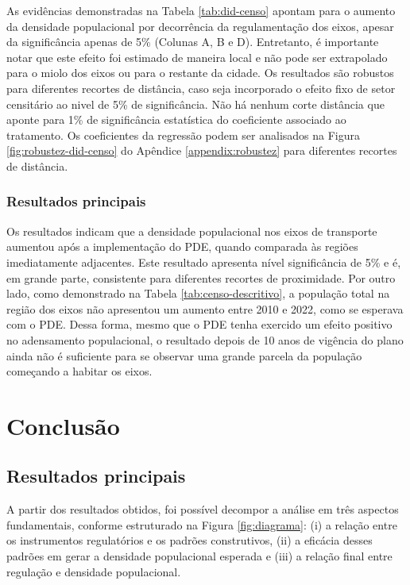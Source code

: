 

As evidências demonstradas na Tabela \ref{tab:did-censo} apontam para o aumento da densidade populacional por decorrência da regulamentação dos eixos, apesar da significância apenas de 5\% (Colunas A, B e D). Entretanto, é importante notar que este efeito foi estimado de maneira local e não pode ser extrapolado para o miolo dos eixos ou para o restante da cidade. Os resultados são robustos para diferentes recortes de distância, caso seja incorporado o efeito fixo de setor censitário ao nivel de 5\% de significância. Não há nenhum corte distância que aponte para 1\% de significância estatística do coeficiente associado ao tratamento. Os coeficientes da regressão podem ser analisados na Figura \ref{fig:robustez-did-censo} do Apêndice \ref{appendix:robustez} para diferentes recortes de distância.

\subsection{Resultados principais}


Os resultados indicam que a densidade populacional nos eixos de transporte aumentou após a implementação do PDE, quando comparada às regiões imediatamente adjacentes. Este resultado apresenta nível significância de 5\% e é, em grande parte, consistente para diferentes recortes de proximidade. Por outro lado, como demonstrado na Tabela \ref{tab:censo-descritivo}, a população total na região dos eixos não apresentou um aumento entre 2010 e 2022, como se esperava com o PDE. Dessa forma, mesmo que o PDE tenha exercido um efeito positivo no adensamento populacional, o resultado depois de 10 anos de vigência do plano ainda não é suficiente para se observar uma grande parcela da população começando a habitar os eixos.


\chapter{Conclusão}
\label{chp:conclusao}

\section{Resultados principais}
\label{sec:conclusao}

A partir dos resultados obtidos, foi possível decompor a análise em três aspectos fundamentais, conforme estruturado na Figura \ref{fig:diagrama}: (i) a relação entre os instrumentos regulatórios e os padrões construtivos, (ii) a eficácia desses padrões em gerar a densidade populacional esperada e (iii) a relação final entre regulação e densidade populacional.

